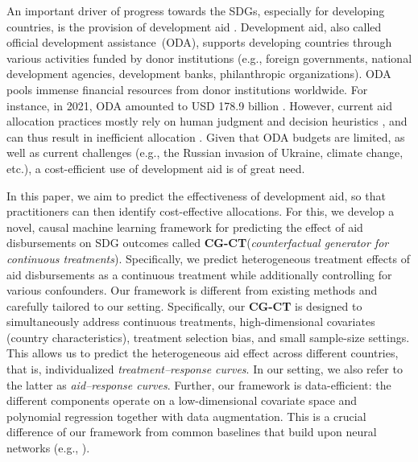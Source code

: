 \documentclass[sigconf]{acmart}
\newcommand{\framework}{\textbf{\mbox{CG-CT}}\xspace}
\newcommand{\frameworklong}{counterfactual generator for continuous treatments\xspace}
\begin{document}

An important driver of progress towards the SDGs, especially for developing countries, is the provision of development aid \cite{OECDoda2018, UNsdg2014}. Development aid, also called official development assistance~(ODA), supports developing countries through various activities funded by donor institutions (e.g., foreign governments, national development agencies, development banks, philanthropic organizations). ODA pools immense financial resources from donor institutions worldwide. For instance, in 2021, ODA amounted to USD 178.9 billion \cite{OECDoda2021}. However, current aid allocation practices mostly rely on human judgment and decision heuristics \cite{OECD2009, OECDsdglab2022, Toetzke2022}, and can thus result in inefficient allocation \cite{GB2020}. Given that ODA budgets are limited, as well as current challenges (e.g., the Russian invasion of Ukraine, climate change, etc.), a cost-efficient use of development aid is of great need.  



In this paper, we aim to predict the effectiveness of development aid, so that practitioners can then identify cost-effective allocations. For this, we develop a novel, causal machine learning framework for predicting the effect of aid disbursements on SDG outcomes called \framework (\emph{\frameworklong}). Specifically, we predict heterogeneous treatment effects of aid disbursements as a continuous treatment while additionally controlling for various confounders. Our framework is different from existing methods and carefully tailored to our setting. Specifically, our \framework is designed to simultaneously address continuous treatments, high-dimensional covariates (country characteristics), treatment selection bias, and small sample-size settings. This allows us to predict the heterogeneous aid effect across different countries, that is, individualized \emph{treatment--response curves}. In our setting, we also refer to the latter as \emph{aid--response curves}. Further, our framework is data-efficient: the different components operate on a low-dimensional covariate space and polynomial regression together with data augmentation. This is a crucial difference of our framework from common baselines that build upon neural networks (e.g., \cite{Bica2020,Schwab2020}).

\end{document}
